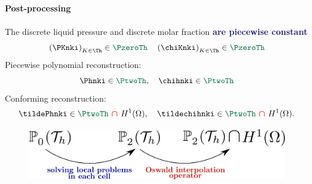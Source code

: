 \begin{frame}
\begin{overprint}
\vspace*{0.2 cm}
\textcolor{cadmiumgreen}{\textbf{Post-processing}}
\\\\
The discrete liquid pressure and discrete molar fraction \textcolor{midnightblue}{\textbf{are piecewise constant}} 
\\
\begin{equation*}
\left(\PKnki\right)_{K \in \Th} \in \textcolor{cadmiumgreen}{\PzeroTh} \quad \left(\chiKnki\right)_{K \in \Th} \in \textcolor{cadmiumgreen}{\PzeroTh}
\end{equation*}
Piecewise polynomial reconstruction:
\begin{equation*}
\Phnki \in \textcolor{cadmiumgreen}{\PtwoTh}, \quad \chihnki \in \textcolor{cadmiumgreen}{\PtwoTh}
\end{equation*}
\vspace{-0.1 cm}
Conforming reconstruction:
\begin{equation*}
\tildePhnki \in \textcolor{cadmiumgreen}{\PtwoTh} \ \textcolor{red}{\bm \cap} \ H^1(\Omega), \quad \tildechihnki \in \textcolor{cadmiumgreen}{\PtwoTh} \ \textcolor{red}{\bm \cap} \ H^1(\Omega).
\end{equation*}
\vspace{-0.8 cm}
\begin{figure}
\centering
\includegraphics[width = 0.6 \textwidth]{fig_article_chap_3/image_oswald2}
\end{figure}


\end{overprint}
\end{frame}

